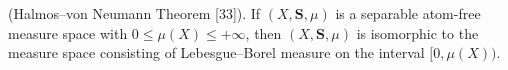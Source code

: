 (Halmos–von Neumann Theorem [33]). If $(X, \mathbf{S}, \mu)$ is a separable atom-free measure space with $0 \leq \mu(X) \leq +\infty$, then $(X, \mathbf{S}, \mu)$ is isomorphic to the measure space consisting of Lebesgue–Borel measure on the interval $[0, \mu(X))$.
